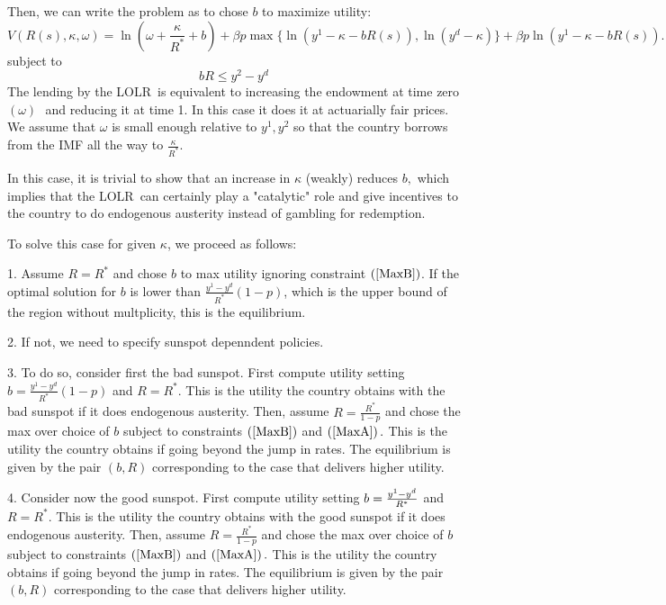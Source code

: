 \documentclass[english,12pt,a4paper]{article}
\begin{document}
Then, we can write the problem as to chose $b$ to maximize utility: 
\begin{equation}
V(R(s),\kappa ,\omega )=\ln (\omega +\frac{\kappa }{R^{\ast }}+b)+\beta
p\max \{\ln (y^{1}-\kappa -bR(s)),\ln (y^{d}-\kappa )\}+\beta p\ln
(y^{1}-\kappa -bR(s)).  \label{OP2}
\end{equation}%
subject to 
\begin{equation*}
bR\leq y^{2}-y^{d}
\end{equation*}%
The lending by the LOLR\ is equivalent to increasing the endowment at time
zero $(\omega )\,$\ and reducing it at time 1. In this case it does it at
actuarially fair prices. We assume that $\omega $ is small enough relative
to $y^{1},y^{2}$ so that the country borrows from the IMF all the way to $%
\frac{\kappa }{R^{\ast }}.$

\bigskip 

In this case, it is trivial to show that an increase in $\kappa $ (weakly)
reduces $b,$ which implies that the LOLR\ can certainly play a "catalytic"
role and give incentives to the country to do endogenous austerity instead
of gambling for redemption. 

To solve this case for given $\kappa $, we proceed as follows:

1. Assume $R=R^{\ast }$ and chose $b$ to max utility ignoring constraint $%
\left( \ref{MaxB}\right) $. If the optimal solution for $b$ is lower than $%
\frac{y^{1}-y^{d}}{R^{\ast }}(1-p)$, which is the upper bound of the region
without multplicity, this is the equilibrium.

2. If not, we need to specify sunspot depenndent policies. 

3. To do so, consider first the bad sunspot. First compute utility setting $%
b=\frac{y^{1}-y^{d}}{R^{\ast }}(1-p)$ and $R=R^{\ast }.$ This is the utility
the country obtains with the bad sunspot if it does endogenous austerity.
Then, assume $R=\frac{R^{\ast }}{1-p}$ and chose the max over choice of $b$
subject to constraints $\left( \ref{MaxB}\right) $ and $\left( \ref{MaxA}%
\right) .$ This is the utility the country obtains if going beyond the jump
in rates. The equilibrium is given by the pair $(b,R)$ corresponding to the
case that delivers higher utility.

4. Consider now the good sunspot. First compute utility setting $b=\frac{%
y^{1}-y^{d}}{R^{\ast }}$ and $R=R^{\ast }.$ This is the utility the country
obtains with the good sunspot if it does endogenous austerity. Then, assume $%
R=\frac{R^{\ast }}{1-p}$ and chose the max over choice of $b$ subject to
constraints $\left( \ref{MaxB}\right) $ and $\left( \ref{MaxA}\right) .$
This is the utility the country obtains if going beyond the jump in rates.
The equilibrium is given by the pair $(b,R)$ corresponding to the case that
delivers higher utility.
\end{document}
